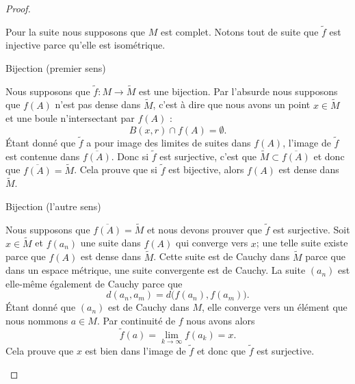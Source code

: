 \begin{proof}
\begin{subproof}
        Pour la suite nous supposons que \( M\) est complet. Notons tout de suite que \( \tilde f\) est injective parce qu'elle est isométrique.

    \item[Bijection (premier sens)]

        Nous supposons que \( \tilde f\colon M\to \tilde M\) est une bijection. Par l'absurde nous supposons que \( f(A)\) n'est pas dense dans \( \tilde M\), c'est à dire que nous avons un point \( x\in \tilde M\) et une boule n'intersectant par \( f(A)\) :
        \begin{equation}
            B(x,r)\cap f(A)=\emptyset.
        \end{equation}
        Étant donné que \( \tilde f\) a pour image des limites de suites dans \( f(A)\), l'image de \( \tilde f\) est contenue dans \( \overline{ f(A) }\). Donc si \( \tilde f\) est surjective, c'est que \( \tilde M\subset \overline{ f(A) }\) et donc que \( \overline{ f(A) }=\tilde M\). Cela prouve que si \( \tilde f\) est bijective, alors \( f(A)\) est dense dans \( \tilde M\).


    \item[Bijection (l'autre sens)]

        Nous supposons que \( \overline{ f(A) }=\tilde M\) et nous devons prouver que \( \tilde f\) est surjective. Soit \( x\in \tilde M\) et \( f(a_n)\) une suite dans \( f(A)\) qui converge vers \( x\); une telle suite existe parce que \( f(A)\) est dense dans \( \tilde M\). Cette suite est de Cauchy dans \( \tilde M\) parce que dans un espace métrique, une suite convergente est de Cauchy. La suite \( (a_n)\) est elle-même également de Cauchy parce que
        \begin{equation}
            d(a_n,a_m)=d\big( f(a_n),f(a_m) \big).
        \end{equation}
        Étant donné que \( (a_n)\) est de Cauchy dans \( M\), elle converge vers un élément que nous nommons \( a\in M\). Par continuité de \( f \) nous avons alors
        \begin{equation}
            \tilde f(a)=\lim_{k\to \infty} f(a_k)=x.
        \end{equation}
        Cela prouve que \( x\) est bien dans l'image de \( \tilde f\) et donc que \( \tilde f\) est surjective.
    \end{subproof}
\end{proof}

